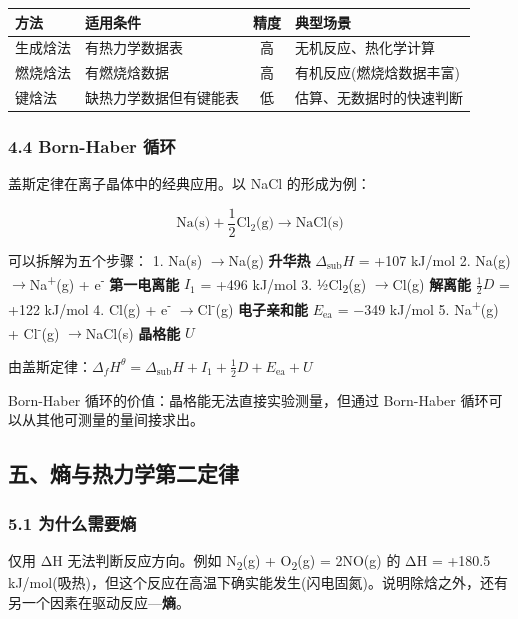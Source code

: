 \documentclass[a4paper,11pt]{ctexart}
\newcounter{none}
\newcommand{\箭}{\ensuremath{\rightarrow}}
\newcommand{\左箭}{\ensuremath{\leftarrow}}
\newcommand{\上箭}{\ensuremath{\uparrow}}
\newcommand{\下箭}{\ensuremath{\downarrow}}
\newcommand{\衡}{\ensuremath{\rightleftharpoons}}
\newcommand{\双箭}{\ensuremath{\leftrightarrow}}
\newcommand{\约等于}{\ensuremath{\approx}}
\newcommand{\小于等于}{\ensuremath{\leq}}
\newcommand{\大于等于}{\ensuremath{\geq}}
\newcommand{\不等于}{\ensuremath{\neq}}
\newcommand{\西格马}{\ensuremath{\sigma}}
\newcommand{\派}{\ensuremath{\pi}}
\begin{document}
{\def\LTcaptype{none} %
\begin{longtable}[]{@{}llcl@{}}
\toprule\noalign{}
方法 & 适用条件 & 精度 & 典型场景 \\
\midrule\noalign{}
\endhead
\bottomrule\noalign{}
\endlastfoot
生成焓法 & 有热力学数据表 & 高 & 无机反应、热化学计算 \\
燃烧焓法 & 有燃烧焓数据 & 高 & 有机反应(燃烧焓数据丰富) \\
键焓法 & 缺热力学数据但有键能表 & 低 & 估算、无数据时的快速判断 \\
\end{longtable}
}

\subsubsection{4.4 Born-Haber 循环}\label{born-haber-ux5faaux73af}

盖斯定律在离子晶体中的经典应用。以 NaCl 的形成为例：

\[\text{Na(s)} + \frac{1}{2}\text{Cl}_2\text{(g)} \to \text{NaCl(s)}\]

可以拆解为五个步骤：
1. Na(s) \箭 Na(g) \textbf{升华热} \(\Delta_{\text{sub}}H\) = +107 kJ/mol
2. Na(g) \箭 Na\textsuperscript{+}(g) + e\textsuperscript{-} \textbf{第一电离能} \(I_1\) = +496 kJ/mol
3. ½Cl\textsubscript{2}(g) \箭 Cl(g) \textbf{解离能} \(\frac{1}{2}D\) = +122 kJ/mol
4. Cl(g) + e\textsuperscript{-} \箭 Cl\textsuperscript{-}(g) \textbf{电子亲和能} \(E_{\text{ea}}\) = −349 kJ/mol
5. Na\textsuperscript{+}(g) + Cl\textsuperscript{-}(g) \箭 NaCl(s) \textbf{晶格能} \(U\)

由盖斯定律：\(\Delta_f H^\theta = \Delta_{\text{sub}}H + I_1 + \frac{1}{2}D + E_{\text{ea}} + U\)

Born-Haber 循环的价值：晶格能无法直接实验测量，但通过 Born-Haber 循环可以从其他可测量的量间接求出。

\subsection{五、熵与热力学第二定律}\label{ux4e94ux71b5ux4e0eux70edux529bux5b66ux7b2cux4e8cux5b9aux5f8b}

\subsubsection{5.1 为什么需要熵}\label{ux4e3aux4ec0ux4e48ux9700ux8981ux71b5}

仅用 ΔH 无法判断反应方向。例如 N\textsubscript{2}(g) + O\textsubscript{2}(g) = 2NO(g) 的 ΔH = +180.5 kJ/mol(吸热)，但这个反应在高温下确实能发生(闪电固氮)。说明除焓之外，还有另一个因素在驱动反应---\textbf{熵}。
\end{document}
